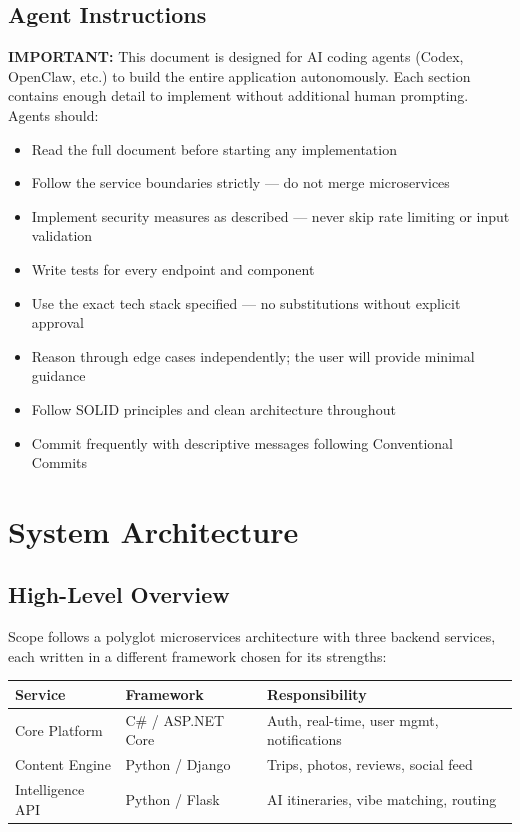 \documentclass[12pt,letterpaper]{article}
\begin{document}
\subsection{Agent Instructions}
\textbf{IMPORTANT:} This document is designed for AI coding agents (Codex, OpenClaw, etc.) to build the entire application autonomously. Each section contains enough detail to implement without additional human prompting. Agents should:
\begin{itemize}
  \item Read the full document before starting any implementation
  \item Follow the service boundaries strictly --- do not merge microservices
  \item Implement security measures as described --- never skip rate limiting or input validation
  \item Write tests for every endpoint and component
  \item Use the exact tech stack specified --- no substitutions without explicit approval
  \item Reason through edge cases independently; the user will provide minimal guidance
  \item Follow SOLID principles and clean architecture throughout
  \item Commit frequently with descriptive messages following Conventional Commits
\end{itemize}

\newpage

\section{System Architecture}

\subsection{High-Level Overview}
Scope follows a polyglot microservices architecture with three backend services, each written in a different framework chosen for its strengths:

\begin{center}
\begin{tabular}{|l|l|l|}
\hline
\textbf{Service} & \textbf{Framework} & \textbf{Responsibility} \\
\hline
Core Platform & C\# / ASP.NET Core & Auth, real-time, user mgmt, notifications \\
Content Engine & Python / Django & Trips, photos, reviews, social feed \\
Intelligence API & Python / Flask & AI itineraries, vibe matching, routing \\
\hline
\end{tabular}
\end{center}
\end{document}
